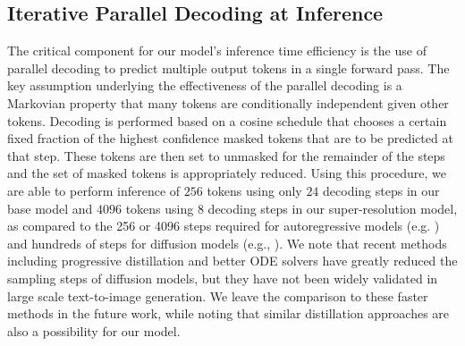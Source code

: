 \subsection{Iterative Parallel Decoding at Inference}
\label{sec:iterativedec}

The critical component for our model's inference time efficiency is the use of parallel decoding to predict multiple output tokens in a single forward pass. The key assumption underlying the effectiveness of the parallel decoding is a Markovian property that many tokens are conditionally independent given other tokens. Decoding is performed based on a cosine schedule \citep{maskgit} that chooses a certain fixed fraction of the highest confidence masked tokens that are to be predicted at that step. These tokens are then set to unmasked for the remainder of the steps and the set of masked tokens is appropriately reduced. Using this procedure, we are able to perform inference of $256$ tokens using only $24$ decoding steps in our base model and $4096$ tokens using $8$ decoding steps in our super-resolution model, as compared to the 256 or 4096 steps required for autoregressive models (e.g. \citep{parti}) and hundreds of steps for diffusion models (e.g., \citep{ldm,imagen}). We note that recent methods including progressive distillation \citep{salimans2022distillation} and better ODE solvers \citep{Zhu2022dpm} have greatly reduced the sampling steps of diffusion models, but they have not been widely validated in large scale text-to-image generation. We leave the comparison to these faster methods in the future work, while noting that similar distillation approaches are also a possibility for our model.

